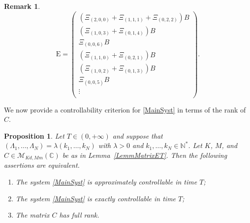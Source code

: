 \documentclass[10pt]{article}
\theoremstyle{plain}
\newtheorem{prop}[theo]{Proposition}
\theoremstyle{definition}
\newtheorem{remk}[theo]{Remark}
\newcommand{\Epsilon}{\mathrm E}
\numberwithin{equation}{section}\numberwithin{figure}{section}\emergencystretch=3em
\begin{document}
\begin{remk}
\[
\Epsilon =
\begin{pmatrix}
\left(\Xi_{(2, 0, 0)} + \Xi_{(1, 1, 1)} + \Xi_{(0, 2, 2)}\right) B \\
\left(\Xi_{(1, 0, 3)} + \Xi_{(0, 1, 4)}\right) B \\
\Xi_{(0, 0, 6)} B \\
\left(\Xi_{(1, 1, 0)} + \Xi_{(0, 2, 1)}\right) B \\
\left(\Xi_{(1, 0, 2)} + \Xi_{(0, 1, 3)}\right) B \\
\Xi_{(0, 0, 5)} B \\
\vdots \\
\end{pmatrix}.
\]
\end{remk}

We now provide a controllability criterion for \eqref{MainSyst} in terms of the rank of $C$.

\begin{prop}
\label{PropCommET}
Let $T \in (0, +\infty)$ and suppose that $(\Lambda_1, \dots, \Lambda_N) = \lambda (k_1, \dots, k_N)$ with $\lambda > 0$ and $k_1, \dots, k_N \in \mathbb N^\ast$. Let $K$, $M$, and $C \in \mathcal M_{Kd, Mm}(\mathbb C)$ be as in Lemma~\ref{LemmMatrixET}. Then the following assertions are equivalent.
\begin{enumerate}
\item\label{CtrlCommETApprox} The system \eqref{MainSyst} is approximately controllable in time $T$;
\item\label{CtrlCommETExact} The system \eqref{MainSyst} is exactly controllable in time $T$;
\item\label{CtrlCommETKalman} The matrix $C$ has full rank.
\end{enumerate}
\end{prop}
\end{document}
